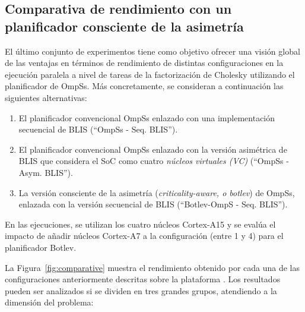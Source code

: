 \subsection{Comparativa de rendimiento con un planificador consciente de la asimetría}
\label{sec:comparative}

El último conjunto de experimentos tiene como objetivo ofrecer una visión global de las ventajas en términos
de rendimiento de distintas configuraciones en la ejecución paralela a nivel de tareas de la factorización de
Cholesky utilizando el planificador de OmpSs. Más concretamente, se consideran a continuación las siguientes
alternativas:

\begin{enumerate}

	\item El planificador convencional OmpSs enlazado con una implementación secuencial de BLIS (``OmpSs - Seq. BLIS'').
	\item El planificador convencional OmpSs enlazado con la versión asimétrica de BLIS que considera el SoC como cuatro {\em núcleos virtuales (VC)} (``OmpSs - Asym. BLIS'').
	\item La versión consciente de la asimetría ({\em criticality-aware, o botlev}) de OmpSs, enlazada con la versión secuencial de BLIS (``Botlev-OmpS - Seq. BLIS''). 

\end{enumerate}

En las ejecuciones, se utilizan los cuatro núcleos Cortex-A15 y se evalúa el impacto de añadir núcleos 
Cortex-A7 a la configuración (entre 1 y 4) para el planificador Botlev.


La Figura~\ref{fig:comparative} muestra el rendimiento obtenido por cada una de las configuraciones
anteriormente descritas sobre la plataforma \odroid. Los resultados pueden ser analizados si se dividen 
en tres grandes grupos, atendiendo a la dimensión del problema:

